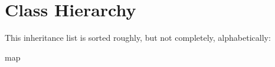 \section{Class Hierarchy}
This inheritance list is sorted roughly, but not completely, alphabetically\-:\begin{DoxyCompactList}
\item {}
\item map\begin{DoxyCompactList}
\item {}
\end{DoxyCompactList}
\item {}
\end{DoxyCompactList}
